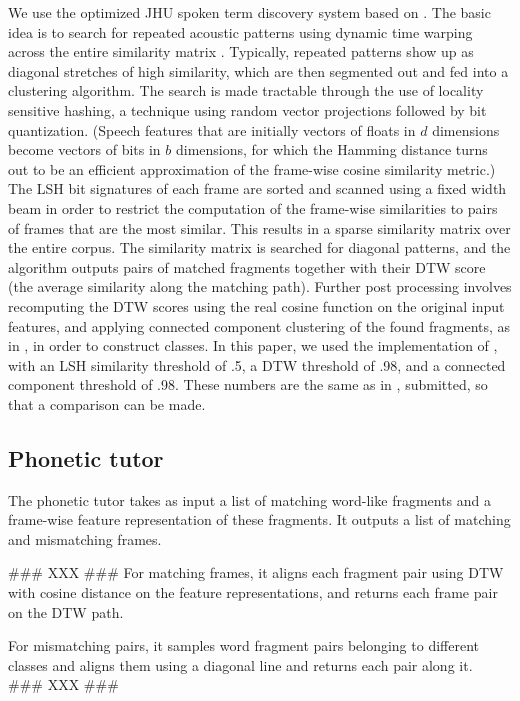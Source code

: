 \documentclass[a4paper]{article}
\begin{document}
We use the optimized JHU spoken term discovery system based on \cite{jansen}. The basic idea is to search for repeated acoustic patterns using dynamic time warping across the entire similarity matrix \cite{park}. Typically, repeated patterns show up as diagonal stretches of high similarity, which are then segmented out and fed into a clustering algorithm. The search is made tractable through the use of locality sensitive hashing, a technique using random vector projections followed by bit quantization. (Speech features that are initially vectors of floats in $d$ dimensions become vectors of bits in $b$ dimensions, for which the Hamming distance turns out to be an efficient approximation of the frame-wise cosine similarity metric.) The LSH bit signatures of each frame are sorted and scanned using a fixed width beam in order to restrict the computation of the frame-wise similarities to pairs of frames that are the most similar. This results in a sparse similarity matrix over the entire corpus. The similarity matrix is searched for diagonal patterns, and the algorithm outputs pairs of matched fragments together with their DTW score (the average similarity along the matching path). Further post processing involves recomputing the DTW scores using the real cosine function on the original input features, and applying connected component clustering of the found fragments, as in \cite{park}, in order to construct classes. In this paper, we used the implementation of \cite{jansen}, with an LSH similarity threshold of .5, a DTW threshold of .98, and a connected component threshold of .98. These numbers are the same as in \cite{XXX}, submitted, so that a comparison can be made.

\subsection{Phonetic tutor}

The phonetic tutor takes as input a list of matching word-like fragments and a frame-wise feature representation of these fragments. It outputs a list of matching and mismatching frames.

### XXX ###
For matching frames, it aligns each fragment pair using DTW with cosine distance on the feature representations, and returns each frame pair on the DTW path.

For mismatching pairs, it samples word fragment pairs belonging to different classes and aligns them using a diagonal line and returns each pair along it.
### XXX ###
\end{document}
